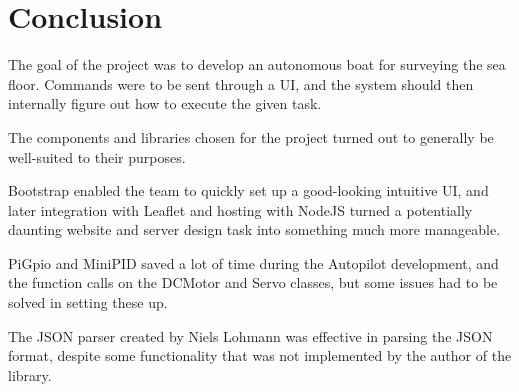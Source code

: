 \newpage
\chapter{Conclusion}
The goal of the project was to develop an autonomous boat for surveying the sea floor. Commands were to be sent through a UI, and the system should then internally figure out how to execute the given task. 

The components and libraries chosen for the project turned out to generally be well-suited to their purposes. 

Bootstrap enabled the team to quickly set up a good-looking intuitive UI, and later integration with Leaflet and hosting with NodeJS turned a potentially daunting website and server design task into something much more manageable. 

PiGpio and MiniPID saved a lot of time during the Autopilot development, and the function calls on the DCMotor and Servo classes, but some issues had to be solved in setting these up. 

The JSON parser created by Niels Lohmann was effective in parsing the JSON format, despite some functionality that was not implemented by the author of the library. 

